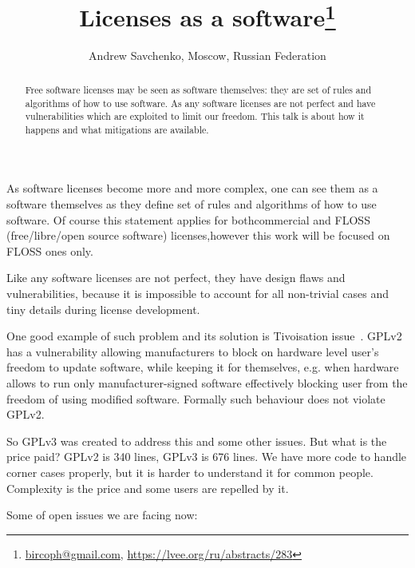 \documentclass[10pt, a5paper]{article}
\begin{document}
\title{Licenses as a software\footnote{\url{bircoph@gmail.com}, \url {https://lvee.org/ru/abstracts/283}}}
\author{Andrew Savchenko, Moscow, Russian Federation}
\maketitle
\begin{abstract}
Free software licenses may be seen as software themselves: they are set of rules and algorithms of how to use software. As any software licenses are not perfect and have vulnerabilities which are exploited to limit our freedom. This talk is about how it happens and what mitigations are available.
\end{abstract}
As software licenses become more and more complex, one can see them as a software themselves as they define set of rules and algorithms of how to use software. Of course this statement applies for both\linebreak commercial and FLOSS (free/libre/open source software) licenses,\linebreak however this work will be focused on FLOSS ones only.

Like any software licenses are not perfect, they have design flaws and vulnerabilities, because it is impossible to account for all non-trivial cases and tiny details during license development.

One good example of such problem and its solution is Tivoisation issue~\cite{Savchenko-1}. GPLv2 has a vulnerability allowing manufacturers to block on hardware level user's freedom to update software, while keeping it for themselves, e.g. when hardware allows to run only manufacturer-signed software effectively blocking user from the freedom of using modified software. Formally such behaviour does not violate GPLv2.

So GPLv3 was created to address this and some other issues. But what is the price paid? GPLv2 is 340 lines, GPLv3 is 676 lines. We have more code to handle corner cases properly, but it is harder to understand it for common people. Complexity is the price and some users are repelled by it.

Some of open issues we are facing now:
\end{document}
